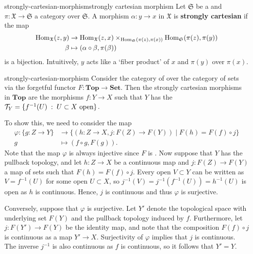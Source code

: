 \begin{topic}{strongly-cartesian-morphism}{strongly cartesian morphism}
    Let $\mathfrak{S}$ be a  and $\pi : \mathfrak{X} \to \mathfrak{S}$ a category over $\mathfrak{S}$. A morphism $\alpha : y \to x$ in $\mathfrak{X}$ is \textbf{strongly cartesian} if the map
    \[ \begin{aligned}
        \operatorname{Hom}_\mathfrak{X}(z, y) &\to \operatorname{Hom}_\mathfrak{X}(z, x) \times_{\operatorname{Hom}_\mathfrak{S}(\pi(z), \pi(x))} \operatorname{Hom}_\mathfrak{S}(\pi(z), \pi(y)) \\
        \beta &\mapsto (\alpha \circ \beta, \pi(\beta))
    \end{aligned} \]
    is a bijection. Intuitively, $y$ acts like a `fiber product' of $x$ and $\pi(y)$ over $\pi(x)$.
\end{topic}

\begin{example}{strongly-cartesian-morphism}
    Consider the category of  over the category of sets via the forgetful functor $F : \textbf{Top} \to \textbf{Set}$. Then the strongly cartesian morphisms in $\textbf{Top}$ are the morphisms $f : Y \to X$ such that $Y$ has the  $\mathcal{T}_Y = \{ f^{-1}(U) \;:\; U \subset X \textup{ open} \}$.
    
    To show this, we need to consider the map
    \[ \begin{aligned}
        \varphi : \{ g : Z \to Y \} &\to \{ (h : Z \to X, j : F(Z) \to F(Y)) \mid F(h) = F(f) \circ j \} \\
        g &\mapsto (f \circ g, F(g)) .
    \end{aligned} \]
    Note that the map $\varphi$ is always injective since $F$ is . Now suppose that $Y$ has the pullback topology, and let $h : Z \to X$ be a continuous map and $j : F(Z) \to F(Y)$ a map of sets such that $F(h) = F(f) \circ j$. Every open $V \subset Y$ can be written as $V = f^{-1}(U)$ for some open $U \subset X$, so $j^{-1}(V) = j^{-1}(f^{-1}(U)) = h^{-1}(U)$ is open as $h$ is continuous. Hence, $j$ is continuous and thus $\varphi$ is surjective.
    
    Conversely, suppose that $\varphi$ is surjective. Let $Y'$ denote the topological space with underlying set $F(Y)$ and the pullback topology induced by $f$. Furthermore, let $j : F(Y') \to F(Y)$ be the identity map, and note that the composition $F(f) \circ j$ is continuous as a map $Y' \to X$. Surjectivity of $\varphi$ implies that $j$ is continuous. The inverse $j^{-1}$ is also continuous as $f$ is continuous, so it follows that $Y' = Y$.
\end{example}

